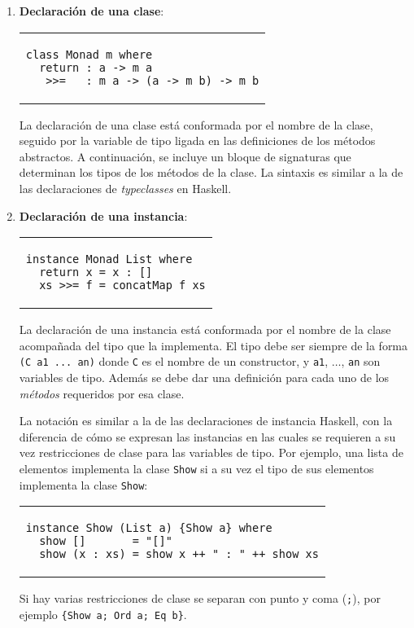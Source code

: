 \begin{enumerate}
  \item {\bf Declaración de una clase}:
      \begin{center}
      \begin{tabular}{l}
      \begin{lstlisting}
class Monad m where
  return : a -> m a 
  _>>=_  : m a -> (a -> m b) -> m b
      \end{lstlisting}
      \end{tabular}
      \end{center}
    La declaración de una clase está conformada por el nombre de la clase,
    seguido por la variable de tipo ligada en las definiciones de los métodos abstractos.
    A continuación, se incluye un bloque de signaturas
    que determinan los tipos de los métodos de la clase.
    La sintaxis es similar a la de las declaraciones de {\em typeclasses} en Haskell.
  \item {\bf Declaración de una instancia}:
      \begin{center}
      \begin{tabular}{l}
      \begin{lstlisting}
instance Monad List where
  return x = x : []
  xs >>= f = concatMap f xs
      \end{lstlisting}
      \end{tabular}
      \end{center}
    La declaración de una instancia está conformada por el nombre de la clase
    acompañada del tipo que la implementa.
    El tipo debe ser siempre de la forma \verb|(C a1 ... an)|
    donde \verb|C| es el nombre de un constructor,
    y \verb|a1|, $\hdots$, \verb|an| son variables de tipo.
    Además se debe dar una definición para cada uno de los {\em métodos}
    requeridos por esa clase.

    La notación es similar a la de las declaraciones de instancia Haskell,
    con la diferencia de cómo se expresan las instancias en las cuales se
    requieren a su vez restricciones de clase para las variables de tipo.
    Por ejemplo, una lista de elementos implementa la clase \verb|Show|
    si a su vez el tipo de sus elementos implementa la clase \verb|Show|:
      \begin{center}
      \begin{tabular}{l}
      \begin{lstlisting}
instance Show (List a) {Show a} where
  show []       = "[]"
  show (x : xs) = show x ++ " : " ++ show xs
      \end{lstlisting}
      \end{tabular}
      \end{center}  
    Si hay varias restricciones de clase se separan con punto y coma (\verb|;|),
    por ejemplo \verb|{Show a; Ord a; Eq b}|.


\end{enumerate}
